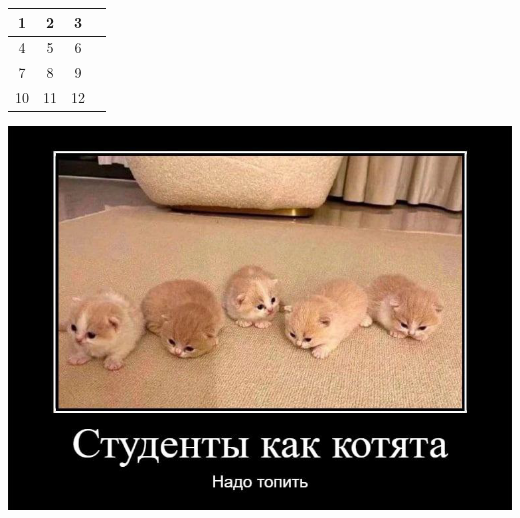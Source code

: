 \documentclass[letterpaper,11pt]{article}
\begin{document}
\begin{center}
\begin{tabular}{ |c|c|c|c| } 
\hline
	1 & 2 & 3 \\
\hline
	4 & 5 & 6 \\
\hline
	7 & 8 & 9 \\
\hline
	10 & 11 & 12 \\
\hline
\end{tabular}
\end{center}

                         
\includegraphics[width=\textwidth]{../data/demotivator.png}
\end{document}
